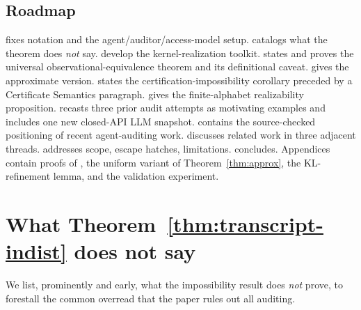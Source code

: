 \documentclass{article}
\theoremstyle{plain}
\theoremstyle{definition}
\theoremstyle{remark}
\begin{document}
\subsection{Roadmap}

 fixes notation and the agent/auditor/access-model setup.
 catalogs what the theorem does \emph{not} say.
 develop the kernel-realization toolkit.
 states and proves the universal observational-equivalence
theorem and its definitional caveat.  gives the
approximate version.  states the certification-impossibility
corollary preceded by a Certificate Semantics paragraph.
 gives the finite-alphabet realizability proposition.
 recasts three prior audit attempts as motivating
examples and includes one new closed-API LLM snapshot.
 contains the source-checked positioning of recent
agent-auditing work.  discusses related work in three
adjacent threads.  addresses scope, escape hatches,
limitations.  concludes. Appendices contain proofs of
, the uniform variant of Theorem~\ref{thm:approx},
the KL-refinement lemma, and the validation experiment.

\section{What Theorem~\ref{thm:transcript-indist} does not say}\label{sec:not-said}

We list, prominently and early, what the impossibility result does \emph{not} prove,
to forestall the common overread that the paper rules out all auditing.
\end{document}
